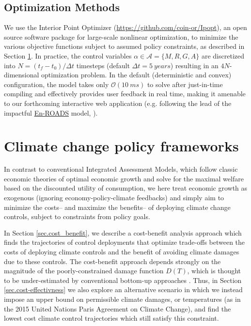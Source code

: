 \documentclass{article}
\begin{document}
\subsection{Optimization Methods}

We use the Interior Point Optimizer (\href{https://github.com/coin-or/Ipopt}{https://github.com/coin-or/Ipopt}), an open source software package for large-scale nonlinear optimization, to minimize the various objective functions subject to assumed policy constraints, as described in Section \ref{sec.policy_frameworks}. In practice, the control variables $\alpha \in \mathcal{A} = \{ M, R, G, A\}$ are discretized into $N = (t_{f} - t_{0}) / \Delta t$ timesteps (default $\Delta t = \SI{5}{years}$) resulting in an $4N$-dimensional optimization problem. In the default (deterministic and convex) configuration, the model takes only $\mathcal{O}(\SI{10}{ms})$ to solve after just-in-time compiling and effectively provides user feedback in real time, making it amenable to our forthcoming interactive web application (e.g. following the lead of the impactful \href{https://en-roads.climateinteractive.org/scenario.html?v=2.7.11}{En-ROADS} model, \citealt{siegel2018roads}).

\section{Climate change policy frameworks}\label{sec.policy_frameworks}

In contrast to conventional Integrated Assessment Models, which follow classic economic theories of optimal economic growth and solve for the maximal welfare based on the discounted utility of consumption, we here treat economic growth as exogenous (ignoring economy-policy-climate feedbacks) and simply aim to minimize the costs– and maximize the benefits– of deploying climate change controls, subject to constraints from policy goals.

In Section \ref{sec.cost_benefit}, we describe a cost-benefit analysis approach which finds the trajectories of control deployments that optimize trade-offs between the costs of deploying climate controls and the benefit of avoiding climate damages due to these controls. The cost-benefit approach depends strongly on the magnitude of the poorly-constrained damage function $D(T)$, which is thought to be under-estimated by conventional bottom-up approaches \citep{ackerman_limitations_2009}. Thus, in Section \ref{sec.cost-effectivness} we also explore an alternative scenario in which we instead impose an upper bound on permissible climate damages, or temperatures (as in the 2015 United Nations Paris Agreement on Climate Change), and find the lowest cost climate control trajectories which still satisfy this constraint.
\end{document}
